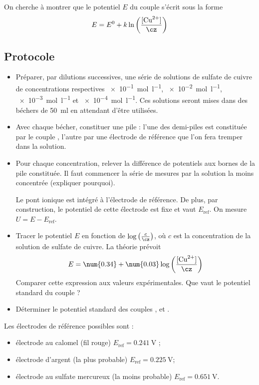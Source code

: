 \documentclass{tp}
\begin{document}
On cherche à montrer que le potentiel $E$ du couple  s'écrit sous la forme
\begin{equation}
  E = E^0 + k \ln \left( \frac{[\ce{Cu^2+}]}{\cz} \right) 
\end{equation}

\subsection{Protocole}%
\label{sub:protocole}

\begin{itemize}
  \item Préparer, par dilutions successives, une série de solutions de sulfate de cuivre de concentrations respectives \SI{e-1}{\mol\per\litre}, \SI{e-2}{\mol\per\litre}, \SI{e-3}{\mol\per\litre} et \SI{e-4}{\mol\per\litre}. Ces solutions seront mises dans des béchers de \SI{50}{\milli\litre} en attendant d'être utilisées.

  \item Avec chaque bécher, constituer une pile : l'une des demi-piles est constituée par le couple , l'autre par une électrode de référence que l'on fera tremper dans la solution.

  \item Pour chaque concentration, relever la différence de potentiels aux bornes de la pile constituée. Il faut commencer la série de mesures par la solution la moins concentrée (expliquer pourquoi).

    Le pont ionique est intégré à l'électrode de référence. De plus, par construction, le potentiel de cette électrode est fixe et vaut $E_\text{ref}$. On mesure $U=E-E_\text{ref}$. 

  \item Tracer le potentiel $E$ en fonction de $\log \left( \frac{c}{\cz} \right) $, où $c$ est la concentration de la solution de sulfate de cuivre. La théorie prévoit 
    \begin{equation}
      E = \num{0.34} + \num{0.03}\log\left( \frac{[\ce{Cu^2+}]}{\cz} \right) 
    \end{equation}
  Comparer cette expression aux valeurs expérimentales. Que vaut le potentiel standard du couple  ?

  \item Déterminer le potentiel standard des couples ,  et .
\end{itemize}

Les électrodes de référence possibles sont :
\begin{itemize}
  \item électrode au calomel (fil rouge) $E_\text{ref}=\SI{0.241}{\volt}$ ;
  \item électrode d'argent (la plus probable) $E_\text{ref}=\SI{0.225}{\volt}$;
  \item électrode au sulfate mercureux  (la moins probable) $E_\text{ref}=\SI{0.651}{\volt}$. 
\end{itemize}
\end{document}
